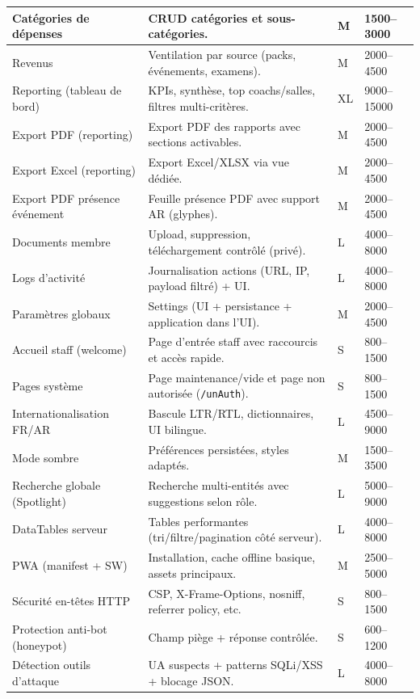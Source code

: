 \documentclass[12pt, a4paper]{article}
\begin{document}
\begin{longtable}{|p{4.2cm}|p{8.2cm}|p{1.6cm}|p{2.0cm}|}
\hline
Catégories de dépenses & CRUD catégories et sous-catégories. & M & 1500--3000 \\
\hline
Revenus & Ventilation par source (packs, événements, examens). & M & 2000--4500 \\
\hline
Reporting (tableau de bord) & KPIs, synthèse, top coachs/salles, filtres multi-critères. & XL & 9000--15000 \\
\hline
Export PDF (reporting) & Export PDF des rapports avec sections activables. & M & 2000--4500 \\
\hline
Export Excel (reporting) & Export Excel/XLSX via vue dédiée. & M & 2000--4500 \\
\hline
Export PDF présence événement & Feuille présence PDF avec support AR (glyphes). & M & 2000--4500 \\
\hline
Documents membre & Upload, suppression, téléchargement contrôlé (privé). & L & 4000--8000 \\
\hline
Logs d'activité & Journalisation actions (URL, IP, payload filtré) + UI. & L & 4000--8000 \\
\hline
Paramètres globaux & Settings (UI + persistance + application dans l'UI). & M & 2000--4500 \\
\hline
Accueil staff (welcome) & Page d'entrée staff avec raccourcis et accès rapide. & S & 800--1500 \\
\hline
Pages système & Page maintenance/vide et page non autorisée (\texttt{/unAuth}). & S & 800--1500 \\
\hline
Internationalisation FR/AR & Bascule LTR/RTL, dictionnaires, UI bilingue. & L & 4500--9000 \\
\hline
Mode sombre & Préférences persistées, styles adaptés. & M & 1500--3500 \\
\hline
Recherche globale (Spotlight) & Recherche multi-entités avec suggestions selon rôle. & L & 5000--9000 \\
\hline
DataTables serveur & Tables performantes (tri/filtre/pagination côté serveur). & L & 4000--8000 \\
\hline
PWA (manifest + SW) & Installation, cache offline basique, assets principaux. & M & 2500--5000 \\
\hline
Sécurité en-têtes HTTP & CSP, X-Frame-Options, nosniff, referrer policy, etc. & S & 800--1500 \\
\hline
Protection anti-bot (honeypot) & Champ piège + réponse contrôlée. & S & 600--1200 \\
\hline
Détection outils d'attaque & UA suspects + patterns SQLi/XSS + blocage JSON. & L & 4000--8000 \\

\end{longtable}
\end{document}
